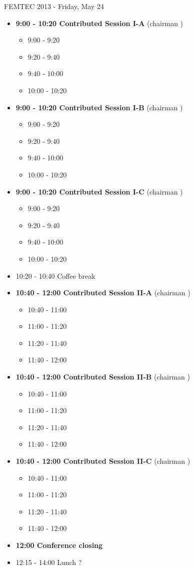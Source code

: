 \documentclass[10pt, A4]{article}%
\begin{document}
\centerline{\huge FEMTEC 2013 - Friday, May 24}
\vspace{4mm}
\begin{itemize}    
\item {\bf 9:00 - 10:20 Contributed Session I-A} (chairman ) 
  \begin{itemize}
    \item 9:00 - 9:20 
    \item 9:20 - 9:40 
    \item 9:40 - 10:00 
    \item 10:00 - 10:20  
  \end{itemize}
  \item {\bf 9:00 - 10:20 Contributed Session I-B} (chairman ) 
  \begin{itemize}
    \item 9:00 - 9:20 
    \item 9:20 - 9:40 
    \item 9:40 - 10:00 
    \item 10:00 - 10:20      
  \end{itemize}
    \item {\bf 9:00 - 10:20 Contributed Session I-C} (chairman ) 
  \begin{itemize}
    \item 9:00 - 9:20 
    \item 9:20 - 9:40 
    \item 9:40 - 10:00 
    \item 10:00 - 10:20      
  \end{itemize}
  \item 10:20 - 10:40 Coffee break
  \item {\bf 10:40 - 12:00 Contributed Session II-A} (chairman ) 
  \begin{itemize}
    \item 10:40 - 11:00 
    \item 11:00 - 11:20 
    \item 11:20 - 11:40 
    \item 11:40 - 12:00 
  \end{itemize}
  \item {\bf 10:40 - 12:00 Contributed Session II-B} (chairman ) 
  \begin{itemize}
    \item 10:40 - 11:00 
    \item 11:00 - 11:20 
    \item 11:20 - 11:40 
    \item 11:40 - 12:00  
  \end{itemize}
  \item {\bf 10:40 - 12:00 Contributed Session II-C} (chairman ) 
  \begin{itemize}
    \item 10:40 - 11:00 
    \item 11:00 - 11:20 
    \item 11:20 - 11:40 
    \item 11:40 - 12:00 
  \end{itemize}
  \item {\bf 12:00 Conference closing}
  \item 12:15 - 14:00 Lunch ?
\newpage
\end{itemize}
\end{document}
